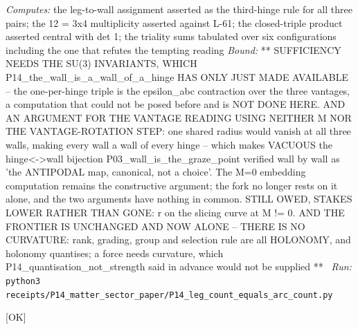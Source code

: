 \begin{description}
\emph{Computes:} the leg-to-wall assignment asserted as the third-hinge rule for all three pairs; the 12 = 3x4 multiplicity asserted against L-61; the closed-triple product asserted central with det 1; the triality sums tabulated over six configurations including the one that refutes the tempting reading
 \emph{Bound:} ** SUFFICIENCY NEEDS THE SU(3) INVARIANTS, WHICH P14\_the\_wall\_is\_a\_wall\_of\_a\_hinge HAS ONLY JUST MADE AVAILABLE -- the one-per-hinge triple is the epsilon\_abc contraction over the three vantages, a computation that could not be posed before and is NOT DONE HERE. AND AN ARGUMENT FOR THE VANTAGE READING USING NEITHER M NOR THE VANTAGE-ROTATION STEP: one shared radius would vanish at all three walls, making every wall a wall of every hinge -- which makes VACUOUS the hinge<->wall bijection P03\_wall\_is\_the\_graze\_point verified wall by wall as 'the ANTIPODAL map, canonical, not a choice'. The M=0 embedding computation remains the constructive argument; the fork no longer rests on it alone, and the two arguments have nothing in common. STILL OWED, STAKES LOWER RATHER THAN GONE: r on the slicing curve at M != 0. AND THE FRONTIER IS UNCHANGED AND NOW ALONE -- THERE IS NO CURVATURE: rank, grading, group and selection rule are all HOLONOMY, and holonomy quantises; a force needs curvature, which P14\_quantisation\_not\_strength said in advance would not be supplied **
\ \emph{Run:} \texttt{python3 receipts/P14\_matter\_sector\_paper/P14\_leg\_count\_equals\_arc\_count.py}
\item[\label{rcpt:P14_the_gap_is_antisymmetry}\texttt{P14\_the\_gap\_is\_antisymmetry}]\hfill\textsf{[OK]}\\

\end{description}

